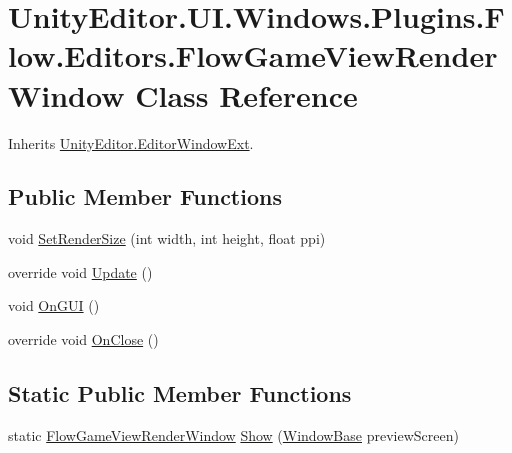 \hypertarget{class_unity_editor_1_1_u_i_1_1_windows_1_1_plugins_1_1_flow_1_1_editors_1_1_flow_game_view_render_window}{}\section{Unity\+Editor.\+U\+I.\+Windows.\+Plugins.\+Flow.\+Editors.\+Flow\+Game\+View\+Render\+Window Class Reference}
\label{class_unity_editor_1_1_u_i_1_1_windows_1_1_plugins_1_1_flow_1_1_editors_1_1_flow_game_view_render_window}


Inherits \hyperlink{class_unity_editor_1_1_editor_window_ext}{Unity\+Editor.\+Editor\+Window\+Ext}.

\subsection*{Public Member Functions}
\begin{DoxyCompactItemize}
\item 
void \hyperlink{class_unity_editor_1_1_u_i_1_1_windows_1_1_plugins_1_1_flow_1_1_editors_1_1_flow_game_view_render_window_ac0f09d408f3096b8f20e165f76781674}{Set\+Render\+Size} (int width, int height, float ppi)
\item 
override void \hyperlink{class_unity_editor_1_1_u_i_1_1_windows_1_1_plugins_1_1_flow_1_1_editors_1_1_flow_game_view_render_window_a6dab754faaa7c37f4042ea8101c20d45}{Update} ()
\item 
void \hyperlink{class_unity_editor_1_1_u_i_1_1_windows_1_1_plugins_1_1_flow_1_1_editors_1_1_flow_game_view_render_window_a0064d8fc12ac761f2c8c1103d74941a9}{On\+G\+U\+I} ()
\item 
override void \hyperlink{class_unity_editor_1_1_u_i_1_1_windows_1_1_plugins_1_1_flow_1_1_editors_1_1_flow_game_view_render_window_aea0a2f9619d1a2c38795ec6631cd7641}{On\+Close} ()
\end{DoxyCompactItemize}
\subsection*{Static Public Member Functions}
\begin{DoxyCompactItemize}
\item 
static \hyperlink{class_unity_editor_1_1_u_i_1_1_windows_1_1_plugins_1_1_flow_1_1_editors_1_1_flow_game_view_render_window}{Flow\+Game\+View\+Render\+Window} \hyperlink{class_unity_editor_1_1_u_i_1_1_windows_1_1_plugins_1_1_flow_1_1_editors_1_1_flow_game_view_render_window_aecf5df89b2a21847939b69c70b9c368d}{Show} (\hyperlink{class_unity_engine_1_1_u_i_1_1_windows_1_1_window_base}{Window\+Base} preview\+Screen)
\end{DoxyCompactItemize}
